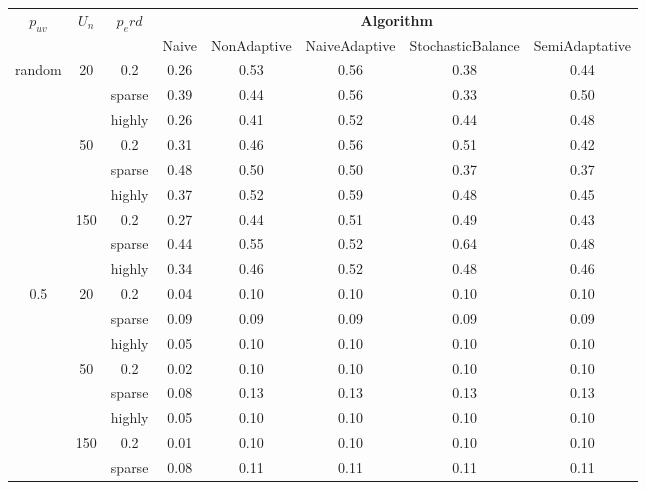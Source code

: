 \documentclass[12pt, twocolumn]{article}
\begin{document}
\begin{table}[h]
    \centering
    \renewcommand{\arraystretch}{1.}
    \setlength{\tabcolsep}{6pt}
    \begin{adjustbox}{max width=\textwidth}
    \begin{tabular}{cccccccc}
        \toprule
        \multirow{2}{*}{\textbf{$p_{uv}$}} & \multirow{2}{*}{\textbf{$U_n$}} & \multirow{2}{*}{\textbf{$p_erd$}} & \multicolumn{5}{c}{\textbf{Algorithm}} \\
        \cmidrule(lr){4-8}
        & & & Naive & NonAdaptive & NaiveAdaptive & StochasticBalance & SemiAdaptative \\
        \midrule
        \multirow{9}{*}{random} & \multirow{3}{*}{20} & 0.2 & 0.26 & 0.53 & 0.56 & 0.38 & 0.44 \\
        & & sparse & 0.39 & 0.44 & 0.56 & 0.33 & 0.50 \\
        & & highly & 0.26 & 0.41 & 0.52 & 0.44 & 0.48 \\
        \cmidrule(lr){2-8}
        & \multirow{3}{*}{50} & 0.2 & 0.31 & 0.46 & 0.56 & 0.51 & 0.42 \\
        & & sparse & 0.48 & 0.50 & 0.50 & 0.37 & 0.37 \\
        & & highly & 0.37 & 0.52 & 0.59 & 0.48 & 0.45 \\
        \cmidrule(lr){2-8}
        & \multirow{3}{*}{150} & 0.2 & 0.27 & 0.44 & 0.51 & 0.49 & 0.43 \\
        & & sparse & 0.44 & 0.55 & 0.52 & 0.64 & 0.48 \\
        & & highly & 0.34 & 0.46 & 0.52 & 0.48 & 0.46 \\
        \midrule
        \multirow{9}{*}{0.5} & \multirow{3}{*}{20} & 0.2 & 0.04 & 0.10 & 0.10 & 0.10 & 0.10 \\
        & & sparse & 0.09 & 0.09 & 0.09 & 0.09 & 0.09 \\
        & & highly & 0.05 & 0.10 & 0.10 & 0.10 & 0.10 \\
        \cmidrule(lr){2-8}
        & \multirow{3}{*}{50} & 0.2 & 0.02 & 0.10 & 0.10 & 0.10 & 0.10 \\
        & & sparse & 0.08 & 0.13 & 0.13 & 0.13 & 0.13 \\
        & & highly & 0.05 & 0.10 & 0.10 & 0.10 & 0.10 \\
        \cmidrule(lr){2-8}
        & \multirow{3}{*}{150} & 0.2 & 0.01 & 0.10 & 0.10 & 0.10 & 0.10 \\
        & & sparse & 0.08 & 0.11 & 0.11 & 0.11 & 0.11 \\

\end{tabular}
\end{adjustbox}
\end{table}
\end{document}
